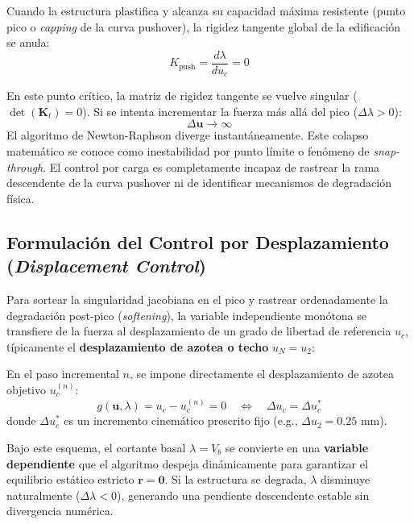 \documentclass[11pt,letterpaper]{article}
\begin{document}
Cuando la estructura plastifica y alcanza su capacidad máxima resistente (punto pico o \textit{capping} de la curva pushover), la rigidez tangente global de la edificación se anula:
\begin{equation}
    K_{\text{push}} = \frac{d\lambda}{du_c} = 0
\end{equation}

En este punto crítico, la matriz de rigidez tangente se vuelve singular ($\det(\mathbf{K}_t) = 0$). Si se intenta incrementar la fuerza más allá del pico ($\Delta \lambda > 0$):
\begin{equation}
    \Delta \mathbf{u} \to \infty
\end{equation}
El algoritmo de Newton-Raphson diverge instantáneamente. Este colapso matemático se conoce como inestabilidad por punto límite o fenómeno de \textit{snap-through}. El control por carga es completamente incapaz de rastrear la rama descendente de la curva pushover ni de identificar mecanismos de degradación física.

\subsection{Formulación del Control por Desplazamiento (\textit{Displacement Control})}

Para sortear la singularidad jacobiana en el pico y rastrear ordenadamente la degradación post-pico (\textit{softening}), la variable independiente monótona se transfiere de la fuerza al desplazamiento de un grado de libertad de referencia $u_c$, típicamente el \textbf{desplazamiento de azotea o techo} $u_N = u_2$:
\begin{conceptbox}
En el paso incremental $n$, se impone directamente el desplazamiento de azotea objetivo $u_c^{(n)}$:
\begin{equation}
    g(\mathbf{u}, \lambda) = u_c - u_c^{(n)} = 0 \quad \iff \quad \Delta u_c = \Delta u_c^*
\end{equation}
donde $\Delta u_c^*$ es un incremento cinemático prescrito fijo (e.g., $\Delta u_2 = 0.25\text{ mm}$).
\end{conceptbox}

Bajo este esquema, el cortante basal $\lambda = V_b$ se convierte en una \textbf{variable dependiente} que el algoritmo despeja dinámicamente para garantizar el equilibrio estático estricto $\mathbf{r} = \mathbf{0}$. Si la estructura se degrada, $\lambda$ disminuye naturalmente ($\Delta \lambda < 0$), generando una pendiente descendente estable sin divergencia numérica.
\end{document}
